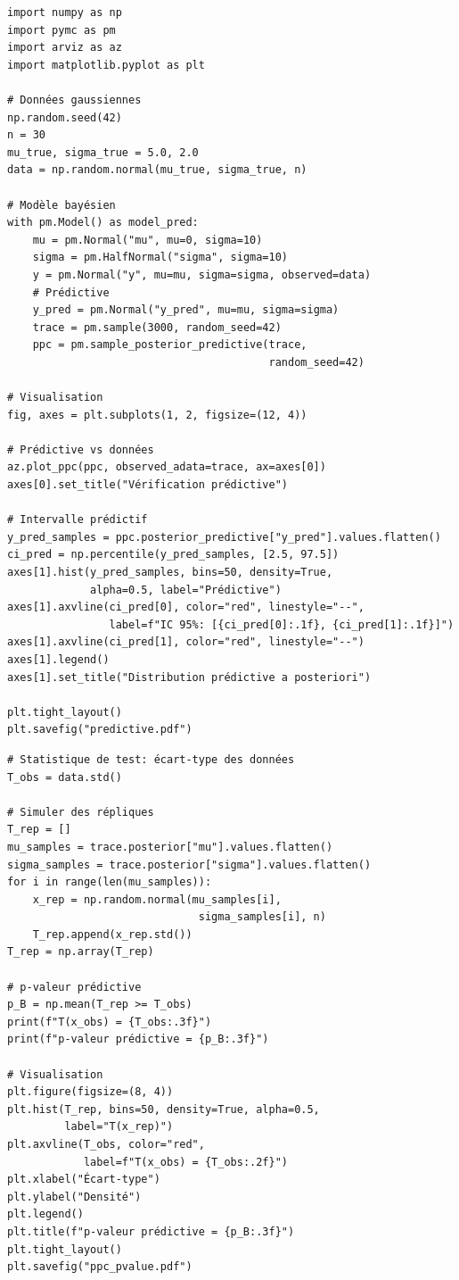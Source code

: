 \begin{codeblock}[title=\textbf{Distribution pr\'edictive a posteriori}]
\begin{verbatim}
import numpy as np
import pymc as pm
import arviz as az
import matplotlib.pyplot as plt

# Données gaussiennes
np.random.seed(42)
n = 30
mu_true, sigma_true = 5.0, 2.0
data = np.random.normal(mu_true, sigma_true, n)

# Modèle bayésien
with pm.Model() as model_pred:
    mu = pm.Normal("mu", mu=0, sigma=10)
    sigma = pm.HalfNormal("sigma", sigma=10)
    y = pm.Normal("y", mu=mu, sigma=sigma, observed=data)
    # Prédictive
    y_pred = pm.Normal("y_pred", mu=mu, sigma=sigma)
    trace = pm.sample(3000, random_seed=42)
    ppc = pm.sample_posterior_predictive(trace,
                                         random_seed=42)

# Visualisation
fig, axes = plt.subplots(1, 2, figsize=(12, 4))

# Prédictive vs données
az.plot_ppc(ppc, observed_adata=trace, ax=axes[0])
axes[0].set_title("Vérification prédictive")

# Intervalle prédictif
y_pred_samples = ppc.posterior_predictive["y_pred"].values.flatten()
ci_pred = np.percentile(y_pred_samples, [2.5, 97.5])
axes[1].hist(y_pred_samples, bins=50, density=True,
             alpha=0.5, label="Prédictive")
axes[1].axvline(ci_pred[0], color="red", linestyle="--",
                label=f"IC 95%: [{ci_pred[0]:.1f}, {ci_pred[1]:.1f}]")
axes[1].axvline(ci_pred[1], color="red", linestyle="--")
axes[1].legend()
axes[1].set_title("Distribution prédictive a posteriori")

plt.tight_layout()
plt.savefig("predictive.pdf")
\end{verbatim}
\end{codeblock}

\begin{codeblock}[title=\textbf{$p$-valeur pr\'edictive bay\'esienne}]
\begin{verbatim}
# Statistique de test: écart-type des données
T_obs = data.std()

# Simuler des répliques
T_rep = []
mu_samples = trace.posterior["mu"].values.flatten()
sigma_samples = trace.posterior["sigma"].values.flatten()
for i in range(len(mu_samples)):
    x_rep = np.random.normal(mu_samples[i],
                              sigma_samples[i], n)
    T_rep.append(x_rep.std())
T_rep = np.array(T_rep)

# p-valeur prédictive
p_B = np.mean(T_rep >= T_obs)
print(f"T(x_obs) = {T_obs:.3f}")
print(f"p-valeur prédictive = {p_B:.3f}")

# Visualisation
plt.figure(figsize=(8, 4))
plt.hist(T_rep, bins=50, density=True, alpha=0.5,
         label="T(x_rep)")
plt.axvline(T_obs, color="red",
            label=f"T(x_obs) = {T_obs:.2f}")
plt.xlabel("Écart-type")
plt.ylabel("Densité")
plt.legend()
plt.title(f"p-valeur prédictive = {p_B:.3f}")
plt.tight_layout()
plt.savefig("ppc_pvalue.pdf")
\end{verbatim}
\end{codeblock}

